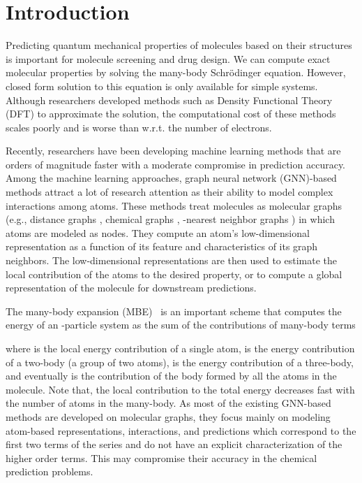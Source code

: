 \documentclass[conference]{IEEEtran}
\begin{document}
\section{Introduction}
Predicting quantum mechanical properties of molecules based on their structures is important for molecule screening and drug design. We can compute exact molecular properties by solving the many-body Schr\"{o}dinger equation. However, closed form solution to this equation is only available for simple systems. Although researchers developed methods such as Density Functional Theory (DFT) \cite{hohenberg1964inhomogeneous} to approximate the solution, the computational cost of these methods scales poorly and is worse than  w.r.t. the number of electrons. 

Recently, researchers have been developing machine learning methods that are orders of magnitude faster with a moderate compromise in prediction accuracy. Among the machine learning approaches, graph neural network (GNN)-based methods attract a lot of research attention as their ability to model complex interactions among atoms. These methods treat molecules as molecular graphs (e.g., distance graphs \cite{unke2019physnet, SchNet-1, SchNet-2, MGCN}, chemical graphs \cite{MPNN}, -nearest neighbor graphs \cite{NMP-edge}) in which atoms are modeled as nodes. They compute an atom's low-dimensional representation as a function of its feature and characteristics of its graph neighbors. The low-dimensional representations are then used to estimate the local contribution of the atoms to the desired property, or to compute a global representation of the molecule for downstream predictions.





The many-body expansion (MBE)~\cite{MBE-1, MBE-2, MBE-NN} is an important scheme that computes the energy of an -particle system as the sum of the contributions of many-body terms

where  is the local energy contribution of a single atom,  is the energy contribution of a two-body (a group of two atoms),  is the energy contribution of a three-body, and eventually  is the contribution of the body formed by all the atoms in the molecule. Note that, the local contribution to the total energy decreases fast with the number of atoms in the many-body. 
As most of the existing GNN-based methods are developed on molecular graphs, they focus mainly on modeling atom-based representations, interactions, and predictions which correspond to the first two terms of the series and do not have an explicit characterization of the higher order terms. This may compromise their accuracy in the chemical prediction problems.
\end{document}
